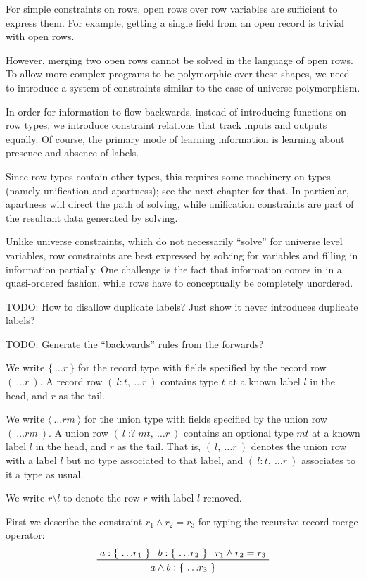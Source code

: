 \documentclass[11pt, twoside, reqno]{book}
\begin{document}
For simple constraints on rows, open rows over row variables are sufficient to express them.
For example, getting a single field from an open record is trivial with open rows.

However, merging two open rows cannot be solved in the language of open rows.
To allow more complex programs to be polymorphic over these shapes, we need to introduce a system of constraints similar to the case of universe polymorphism.

In order for information to flow backwards, instead of introducing functions on row types, we introduce constraint relations that track inputs and outputs equally.
Of course, the primary mode of learning information is learning about presence and absence of labels.

Since row types contain other types, this requires some machinery on types (namely unification and apartness); see the next chapter for that.
In particular, apartness will direct the path of solving, while unification constraints are part of the resultant data generated by solving.

Unlike universe constraints, which do not necessarily “solve” for universe level variables, row constraints are best expressed by solving for variables and filling in information partially.
One challenge is the fact that information comes in in a quasi-ordered fashion, while rows have to conceptually be completely unordered.

TODO: How to disallow duplicate labels?
Just show it never introduces duplicate labels?

TODO: Generate the ``backwards'' rules from the forwards?

We write $\{\ \dots\!r\ \}$ for the record type with fields specified by the record row $(\ \dots\!r\ )$.
A record row $(\ l : t,\ \dots\!r\ )$ contains type $t$ at a known label $l$ in the head, and $r$ as the tail.

We write $\langle\ \dots\!\mathit{rm}\ \rangle$ for the union type with fields specified by the union row $(\ \dots\!\mathit{rm}\ )$.
A union row $(\ l \mathop{{:}{?}} \mathit{mt},\ \dots\!r\ )$ contains an optional type $\mathit{mt}$ at a known label $l$ in the head, and $r$ as the tail.
That is, $(\ l,\ \dots\!r\ )$ denotes the union row with a label $l$ but no type associated to that label, and $(\ l : t,\ \dots\!r\ )$ associates to it a type as usual.

We write $r \setminus l$ to denote the row $r$ with label $l$ removed.

First we describe the constraint $r_1 \land r_2 = r_3$ for typing the recursive record merge operator:
\begin{displaymath}
\prftree{a : \{\ \dots\!r_1\ \}}{b : \{\ \dots\!r_2\ \}}{r_1 \land r_2 = r_3}{a \land b : \{\ \dots\!r_3\ \}}
\end{displaymath}
\end{document}
